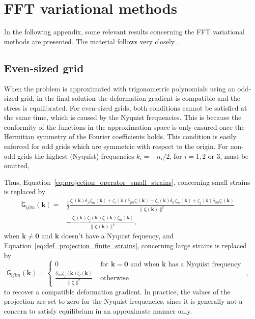\chapter{FFT variational methods}\label{app:fft}

In the following appendix, some relevant results concerning the FFT variational methods are presented.
The material follows very closely \cite{de_geus_finite_2017}.

\section{Even-sized grid}

When the problem is approximated with trigonometric polynomials using an odd-sized grid, in the final solution the deformation gradient is compatible and the stress is equilibrated.
For even-sized grids, both conditions cannot be satisfied at the same time, which is caused by the Nyquist frequencies.
This is because the conformity of the functions in the approximation space is only ensured once the Hermitian symmetry of the Fourier coefficients holds.
This condition is easily enforced for odd grids which are symmetric with respect to the origin.
For non-odd grids the highest (Nyquist) frequencies \(k_i=-n_i / 2\), for \(i=1,2\) or 3, must be omitted,

Thus, Equation~\eqref{eq:projection_operator_small_strains}, concerning small strains is replaced by
\begin{equation}
\begin{aligned}
\breve{\mathsf G}_{i j l m}(\boldsymbol{k})=& \frac{1}{2} \frac{\zeta_{i}(\boldsymbol{k}) \delta_{j l} \zeta_{m}(\boldsymbol{k})+\zeta_{i}(\boldsymbol{k}) \delta_{j m} \zeta_{l}(\boldsymbol{k})+\zeta_{j}(\boldsymbol{k}) \delta_{i l} \zeta_{m}(\boldsymbol{k})+\zeta_{j}(\boldsymbol{k}) \delta_{i m} \zeta_{l}(\boldsymbol{k})}{\|\boldsymbol{\zeta}(\boldsymbol{k})\|^{2}} \\
&-\frac{\zeta_{i}(\boldsymbol{k}) \zeta_{j}(\boldsymbol{k}) \zeta_{l}(\boldsymbol{k}) \zeta_{m}(\boldsymbol{k})}{\|\boldsymbol{\zeta}(\boldsymbol{k})\|^{4}},
\end{aligned}
\end{equation}
when \(\bm k \neq \bm 0\) and \(\bm k\) doesn't have a Nyquist fequency, and Equation~\eqref{eq:def_projection_finite_strains}, concerning large strains is replaced by
\begin{equation}
\breve{\mathsf G}_{i j l m}\left(\bm{k}\right)=\begin{cases}
0 & \text { for } \bm k=\bm 0 \text { and when } \bm k \text { has a Nyquist frequency } \\[5pt]
\displaystyle{\frac{\delta_{i m} \zeta_{j}\left(\bm{k}\right) \zeta_{l}\left(\bm{k}\right)}{\|\bm{\zeta}\|^{2}} } & \text { otherwise }
\end{cases},
\end{equation}
to recover a compatible deformation gradient.
In practice, the values of the projection are set to zero for the Nyquist frequencies, since it is generally not a concern to satisfy equilibrium in an approximate manner only.

